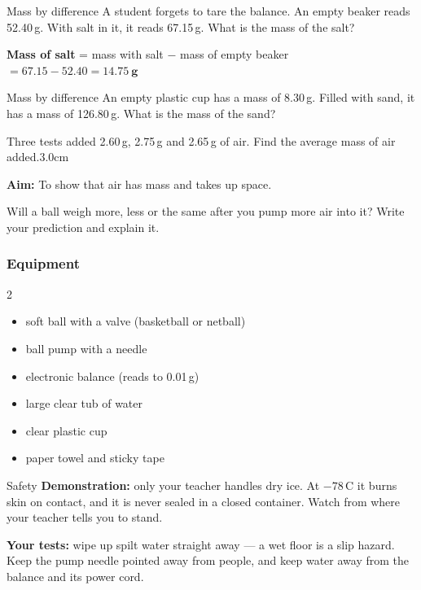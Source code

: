 \begin{workedex}{Mass by difference}
A student forgets to tare the balance. An empty beaker reads 52.40\,g. With salt in it, it reads 67.15\,g. What is the mass of the salt?

\medskip
\textbf{Mass of salt} = mass with salt $-$ mass of empty beaker $= 67.15 - 52.40 = \mathbf{14.75\ g}$
\end{workedex}

\begin{wedo}{Mass by difference}
An empty plastic cup has a mass of 8.30\,g. Filled with sand, it has a mass of 126.80\,g. What is the mass of the sand?
\workbox{3cm}
\end{wedo}

\begin{youdobox}
         {Three tests added 2.60\,g, 2.75\,g and 2.65\,g of air. Find the average mass of air added.}{3.0cm}
\end{youdobox}


\textbf{Aim:} To show that air has mass and takes up space.

\task Will a ball weigh more, less or the same after you pump more air into it? Write your prediction and explain it. 
\answerbox{5cm}

\subsubsection*{Equipment}
\begin{multicols}{2}
\begin{itemize}[leftmargin=1.2em, itemsep=0pt, topsep=0pt]
  \item soft ball with a valve (basketball or netball)
  \item ball pump with a needle
  \item electronic balance (reads to 0.01\,g)
  \item large clear tub of water
  \item clear plastic cup
  \item paper towel and sticky tape
\end{itemize}
\end{multicols}

\begin{infobox}{Safety}
\textbf{Demonstration:} only your teacher handles dry ice. At $-78$\,\textdegree C it burns skin on contact, and it is never sealed in a closed container. Watch from where your teacher tells you to stand.\par
\textbf{Your tests:} wipe up spilt water straight away --- a wet floor is a slip hazard. Keep the pump needle pointed away from people, and keep water away from the balance and its power cord.
\end{infobox}

